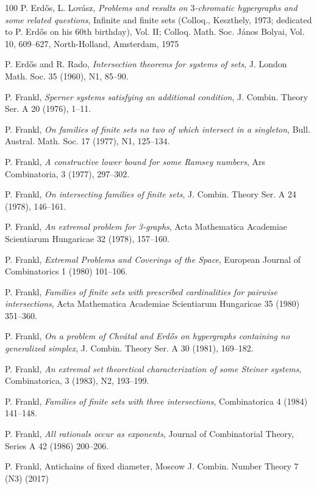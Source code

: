 \documentclass[graybox]{svmult}
\begin{document}
\begin{thebibliography}{100}
 P. Erd\H os, L. Lov\'asz, {\it Problems and results on $3$-chromatic hypergraphs and some related questions}, Infinite and finite sets (Colloq., Keszthely, 1973; dedicated to P. Erd\H os on his 60th birthday), Vol. II; Colloq. Math. Soc. J\'anos Bolyai, Vol. 10, 609--627, North-Holland, Amsterdam, 1975

 P. Erd\H os and R. Rado, {\it Intersection theorems for systems of sets}, J. London Math. Soc. 35 (1960), N1, 85--90.

 P. Frankl, {\it Sperner systems satisfying an additional condition}, J. Combin. Theory Ser. A 20 (1976), 1--11.

 P. Frankl, {\it On families of finite sets no two of which intersect in a singleton}, Bull. Austral. Math. Soc. 17 (1977), N1, 125--134.

 P. Frankl, {\it A constructive lower bound for some Ramsey numbers}, Ars Combinatoria, 3 (1977),
297--302.

 P. Frankl, {\it On intersecting families of finite sets}, J. Combin. Theory Ser. A 24 (1978), 146--161.

 P. Frankl, {\it An extremal problem for 3-graphs}, Acta Mathematica Academiae Scientiarum Hungaricae 32 (1978), 157--160.

 P. Frankl, {\it Extremal Problems and Coverings of the Space}, European Journal of Combinatorics 1 (1980) 101--106.

 P. Frankl, {\it Families of finite sets with prescribed cardinalities for pairwise intersections}, Acta Mathematica Academiae Scientiarum Hungaricae 35 (1980) 351--360.

 P. Frankl, {\it On a problem of Chv\'atal and Erd\H os on hypergraphs containing no generalized simplex}, J. Combin. Theory Ser. A 30 (1981), 169--182.

 P. Frankl, {\it An extremal set theoretical characterization of some Steiner systems}, Combinatorica, 3 (1983), N2, 193--199.

 P. Frankl, {\it Families of finite sets with three intersections}, Combinatorica 4 (1984) 141--148.

 P. Frankl, {\it All rationals occur as exponents}, Journal of Combinatorial Theory, Series A 42 (1986) 200--206.

 P. Frankl, {Antichains of fixed diameter}, Moscow J. Combin. Number Theory 7 (N3) (2017)


\end{thebibliography}
\end{document}
